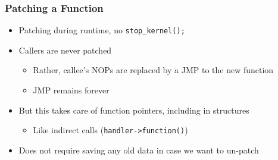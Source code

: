 \documentclass[xcolor=dvipsnames,handout]{beamer}
\newcommand{\code}[2][]{\lstinline[columns=fullflexible, basicstyle=\ttfamily,
	#1]$#2$}
\begin{document}
\begin{frame}[fragile]
\begin{center}
  \end{center}

\end{frame}

\begin{frame}
  \frametitle{Patching a Function}

  \begin{itemize}
    \item Patching during runtime, no \code{stop_kernel();}

    \pause

    \item Callers are never patched
    \begin{itemize}
      \item Rather, callee's NOPs are replaced by a JMP to the new function
      \item JMP remains forever
    \end{itemize}

    \pause
    \bigskip

    \item But this takes care of function pointers, including in structures
    \begin{itemize}
      \item Like indirect calls (\code{handler->function()})
    \end{itemize}

    \pause

    \item Does not require saving any old data in case we want to un-patch
  \end{itemize}

\end{frame}
\end{document}
